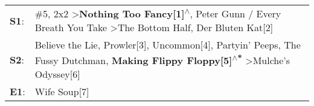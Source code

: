 \begin{supertabular}{p{0.03\textwidth}p{0.92\textwidth}}
 \textbf{S1}:  &                                      \#5\textsuperscript{}, \enspace 2x2\textsuperscript{} \textgreater \enspace \textbf{Nothing Too Fancy[1]\textsuperscript{$\wedge$}}, \enspace Peter Gunn / Every Breath You Take\textsuperscript{} \textgreater \enspace The Bottom Half\textsuperscript{}, \enspace Der Bluten Kat[2]\textsuperscript{}  \enspace  \\
 \textbf{S2}:  &  Believe the Lie\textsuperscript{}, \enspace Prowler[3]\textsuperscript{}, \enspace Uncommon[4]\textsuperscript{}, \enspace Partyin' Peeps\textsuperscript{}, \enspace The Fussy Dutchman\textsuperscript{}, \enspace \textbf{Making Flippy Floppy[5]\textsuperscript{$\wedge$*}} \textgreater \enspace Mulche's Odyssey[6]\textsuperscript{}  \enspace  \\
 \textbf{E1}:  &                                                                                                                                                                                                                                                                                                                Wife Soup[7]\textsuperscript{}  \enspace  \\
\end{supertabular}
